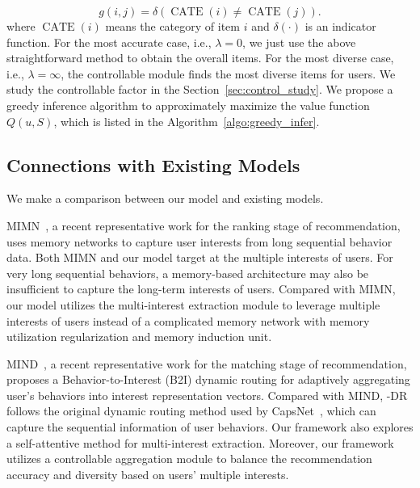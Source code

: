 \begin{equation}
    g(i,j) = \delta(\operatorname{CATE}(i) \neq \operatorname{CATE}(j)).
\end{equation}
where $\operatorname{CATE}(i)$ means the category of item $i$ and $\delta(\cdot)$ is an indicator function. 
For the most accurate case, i.e., $\lambda=0$, we just use the above straightforward method to obtain the overall items. For the most diverse case, i.e., $\lambda=\infty$, the controllable module finds the most diverse items for users. We study the controllable factor in the Section~\ref{sec:control_study}. We propose a greedy inference algorithm to approximately maximize the value function $Q(u,S)$, which is listed in the Algorithm~\ref{algo:greedy_infer}.


\subsection{Connections with Existing Models}
We make a comparison between our model and existing models. 

MIMN~\cite{pi2019practice}, a recent representative work for the ranking stage of recommendation, uses memory networks to capture user interests from long sequential behavior data. Both MIMN and our model target at the multiple interests of users. For very long sequential behaviors, a memory-based architecture may also be insufficient to capture the long-term interests of users. Compared with MIMN, our model utilizes the multi-interest extraction module to leverage multiple interests of users instead of a complicated memory network with memory utilization regularization and memory induction unit. 

MIND~\cite{li2019multi}, a recent representative work for the matching stage of recommendation, proposes a Behavior-to-Interest (B2I) dynamic routing for adaptively aggregating user's behaviors into interest representation vectors. Compared with MIND, \model-DR follows the original dynamic routing method used by CapsNet~\cite{sabour2017dynamic}, which can capture the sequential information of user behaviors. Our framework also explores a self-attentive method for multi-interest extraction. Moreover, our framework utilizes a controllable aggregation module to balance the recommendation accuracy and diversity based on users' multiple interests. 

